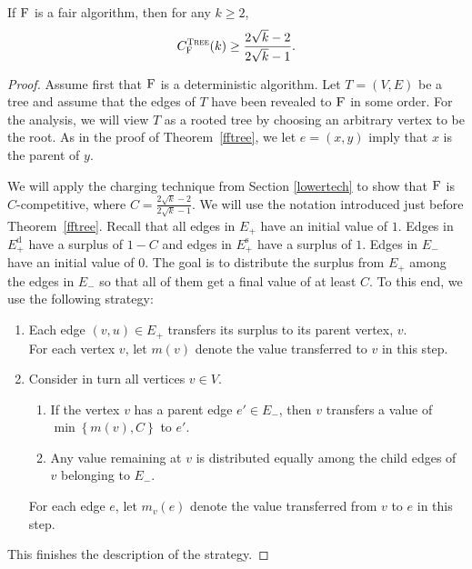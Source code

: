 \documentclass[smallextended]{svjour3}
\newcommand{\ec}{\ensuremath{E_{+}}\xspace}
\newcommand{\ed}{\ensuremath{E_{+}^{\text{d}}}\xspace}
\newcommand{\er}{\ensuremath{E_{-}}\xspace}
\newcommand{\es}{\ensuremath{E_{+}^{\text{s}}}\xspace}
\newcommand{\FAIR}{\ensuremath{\operatorname{\textsc{F}}}\xspace}
\begin{document}
\begin{theorem}
\label{lowktree}
If $\FAIR$ is a fair algorithm, then for any $k \geq 2$,
\begin{displaymath}
C_{\FAIR}^{\text{{\sc Tree}}}(k)\geq\frac{2\sqrt{k}-2}{2\sqrt{k}-1}.
\end{displaymath}
\end{theorem}
\begin{proof}
Assume first that \FAIR is a deterministic algorithm.
Let $T=(V,E)$ be a tree and assume that the edges of $T$ have been revealed to \FAIR in some order. 
For the analysis, we will view $T$ as a rooted tree by choosing an arbitrary vertex to be the root. 
As in the proof of Theorem~\ref{fftree}, we let $e=(x,y)$ imply that $x$ is the parent of $y$.

We will apply the charging technique from Section \ref{lowertech} to show that $\FAIR$ is $C$-competitive, where $C=\frac{2\sqrt{k}-2}{2\sqrt{k}-1}$. 
We will use the notation introduced 
just before Theorem~\ref{fftree}.
Recall that all edges in $\ec$ have an initial value of $1$. Edges in $\ed$ have a surplus of $1-C$ and edges in $\es$ have a surplus of $1$. Edges in $\er$ have an initial value of $0$. The goal is to distribute the surplus from $\ec$ among the edges in $\er$ so that all of them get a final value of at least $C$. To this end, we use the following strategy: 

\begin{enumerate}[Step 1:]
\item  Each edge $(v,u)\in \ec$ transfers its surplus to its
  parent vertex, $v$.\\
 For each vertex $v$, let $m(v)$ denote the value transferred to $v$
  in this step. 
\item Consider in turn all vertices $v\in V$. 
  \begin{enumerate}
  \item If the vertex $v$ has a parent edge $e'\in\er$, then $v$ transfers a
    value of $\min\left\{m(v), C\right\}$ to $e'$.
  \item Any value remaining at $v$ is distributed equally among the
    child edges of $v$ belonging to $\er$.
  \end{enumerate}
  For each edge $e$, let $m_v(e)$ denote the value transferred from $v$ to $e$ in this step.
\end{enumerate}
This finishes the description of the strategy. 


\end{proof}
\end{document}
